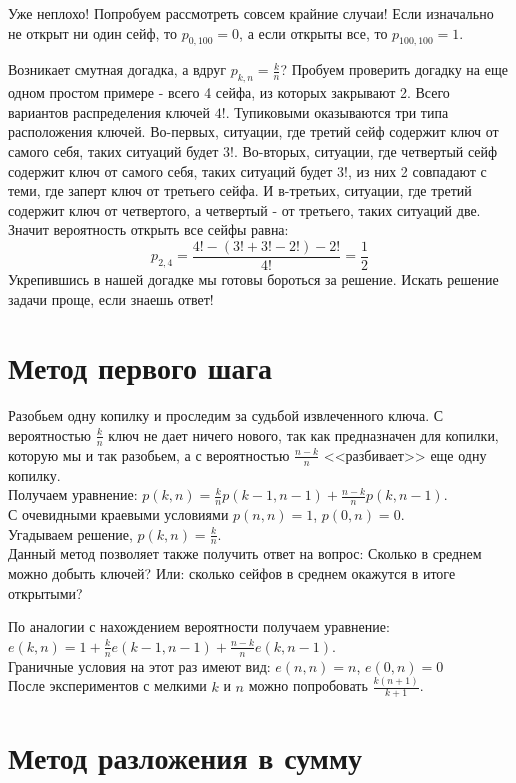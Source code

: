 \documentclass[pdftex,12pt,a4paper]{article}
\begin{document}
Уже неплохо! Попробуем рассмотреть совсем крайние случаи! Если изначально не открыт ни один сейф, то $p_{0,100}=0$, а если открыты все, то $p_{100,100}=1$. 

Возникает смутная догадка, а вдруг $p_{k,n}=\frac{k}{n}$? Пробуем проверить догадку на еще одном простом примере - всего 4 сейфа, из которых закрывают 2. Всего вариантов распределения ключей $4!$. Тупиковыми оказываются три типа расположения ключей. Во-первых, ситуации, где третий сейф содержит ключ от самого себя, таких ситуаций будет $3!$. Во-вторых, ситуации, где четвертый сейф содержит ключ от самого себя, таких ситуаций будет $3!$, из них 2 совпадают с теми, где заперт ключ от третьего сейфа.
И в-третьих, ситуации, где третий содержит ключ от четвертого, а четвертый - от третьего, таких ситуаций две. Значит вероятность открыть все сейфы равна: 
$$
p_{2,4}=\frac{4!-(3!+3!-2!)-2!}{4!}=\frac{1}{2}
$$
Укрепившись в нашей догадке мы готовы бороться за решение. Искать решение задачи проще, если знаешь ответ!

\section{Метод первого шага}
Разобьем одну копилку и проследим за судьбой извлеченного ключа. С
вероятностью $\frac{k}{n}$ ключ не дает ничего нового, так как
предназначен для копилки, которую мы и так разобьем, а с
вероятностью $\frac{n-k}{n}$ <<разбивает>>
еще одну копилку. \\
Получаем уравнение: $p(k,n)=\frac{k}{n}p(k-1,n-1)+\frac{n-k}{n}p(k,n-1)$. \\
С очевидными краевыми условиями $p(n,n)=1$, $p(0,n)=0$. \\
Угадываем решение, $p(k,n)=\frac{k}{n}$. \\

Данный метод позволяет также получить ответ на вопрос:
Сколько в среднем можно добыть ключей? Или: сколько сейфов в среднем окажутся в итоге открытыми?

По аналогии с нахождением вероятности получаем уравнение: \\
$e(k,n)=1+\frac{k}{n}e(k-1,n-1)+\frac{n-k}{n}e(k,n-1)$. \\
Граничные условия на этот раз имеют вид: $e(n,n)=n$, $e(0,n)=0$ \\
После экспериментов с мелкими $k$ и $n$ можно попробовать $\frac{k(n+1)}{k+1}$. \\

\section{Метод разложения в сумму}
\end{document}

